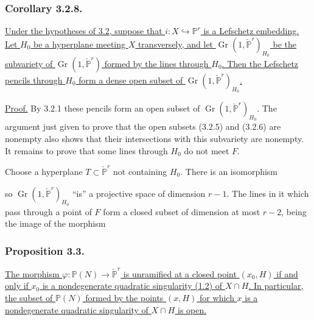 \subsubsection*{Corollary 3.2.8.}
\underline{Under the hypotheses of 3.2, suppose that
$i:X\hookrightarrow\mathbb P^r$ is a Lefschetz embedding.  Let $H_0$
be a hyperplane meeting $X$ transversely, and let
$\operatorname{Gr}(1,\check{\mathbb P}^{r})_{H_0}$ be the subvariety
of $\operatorname{Gr}(1,\check{\mathbb P}^{r})$ formed by the lines
through $H_0$.  Then the Lefschetz pencils through $H_0$ form a dense
open subset of $\operatorname{Gr}(1,\check{\mathbb P}^{r})_{H_0}$.}

\noindent\underline{Proof.}
By 3.2.1 these pencils form an open subset of
$\operatorname{Gr}(1,\check{\mathbb P}^{r})_{H_0}$.  The argument
just given to prove that the open subsets (3.2.5) and (3.2.6) are
nonempty also shows that their intersections with this subvariety are
nonempty.  It remains to prove that some lines through $H_0$ do not
meet $F$.

Choose a hyperplane $T\subset\check{\mathbb P}^{r}$ not containing
$H_0$.  There is an isomorphism
\begin{center}
\end{center}
so $\operatorname{Gr}(1,\check{\mathbb P}^{r})_{H_0}$ ``is'' a
projective space of dimension $r-1$.  The lines in it which pass
through a point of $F$ form a closed subset of dimension at most
$r-2$, being the image of the morphism
\begin{center}
\end{center}

\subsubsection*{Proposition 3.3.}
\underline{The morphism
$\varphi:\mathbb P(N)\to\check{\mathbb P}^{r}$ is unramified at a
closed point $(x_0,H)$ if and only if $x_0$ is a nondegenerate
quadratic singularity (1.2) of $X\cap H$.  In particular, the subset
of $\mathbb P(N)$ formed by the points $(x,H)$ for which $x$ is a
nondegenerate quadratic singularity of $X\cap H$ is open.}

